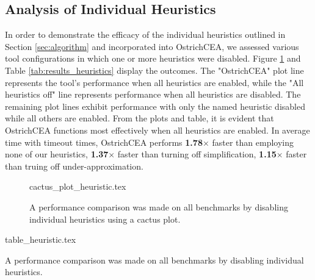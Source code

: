 \subsection{Analysis of Individual Heuristics}
In order to demonstrate the efficacy of the individual heuristics outlined in Section \ref{sec:algorithm} and incorporated into OstrichCEA, we assessed various tool configurations in which one or more heuristics were disabled. Figure \ref{fig:cactus_heuristics} and Table \ref{tab:results_heuristics} display the outcomes. The "OstrichCEA" plot line represents the tool's performance when all heuristics are enabled, while the "All heuristics off" line represents performance when all heuristics are disabled. The remaining plot lines exhibit performance with only the named heuristic disabled while all others are enabled. From the plots and table, it is evident that OstrichCEA functions most effectively when all heuristics are enabled. In average time with timeout times, OstrichCEA performs \textbf{1.78}$\times$ faster than employing none of our heuristics, \textbf{1.37}$\times$ faster than turning off simplification, \textbf{1.15}$\times$ faster than truing off under-approximation.
\begin{figure}
  {cactus_plot_heuristic.tex}
  \caption{A performance comparison was made on all benchmarks by disabling individual heuristics using a cactus plot.}
  \label{fig:cactus_heuristics}
\end{figure}
\begin{table}
  {table_heuristic.tex}
  \caption{A performance comparison was made on all benchmarks by disabling individual heuristics.}
  \label{tab:results_heuristics}
\end{table}

%
